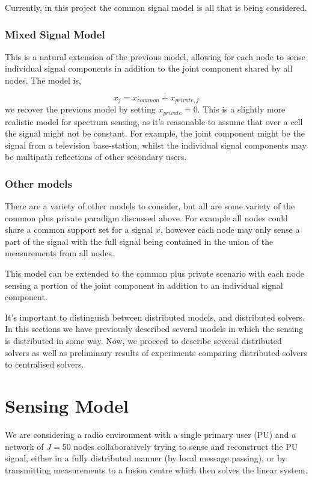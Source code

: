 Currently, in this project the common signal model is all that is being considered. 

\subsubsection{Mixed Signal Model}
This is a natural extension of the previous model, allowing for each node to sense individual signal components in addition to the joint component shared by all nodes. The model is,

\begin{equation}
x_j = x_{common} + x_{private,j}
\end{equation}
we recover the previous model by setting \(x_{private} = 0\). This is a slightly more realistic model for spectrum sensing, as it's reasonable to assume that over a cell the signal might not be constant. For example, the joint component might be the signal from a television base-station, whilst the individual signal components may be multipath reflections of other secondary users. 

\subsubsection{Other models}
There are a variety of other models to consider, but all  are some variety of the common plus private paradigm discussed above. For example all nodes could share a common support set for a signal \(x\), however each node may only sense a part of the signal with the full signal being contained in the union of the measurements from all nodes. 

This model can be extended to the common plus private scenario with each node sensing a portion of the joint component in addition to an individual signal component.

It's important to distinguish between distributed models, and distributed solvers. In this sections we have previously described several models in which the sensing is distributed in some way. Now, we proceed to describe several distributed solvers as well as preliminary results of experiments comparing distributed solvers to centralised solvers.

\section{Sensing Model}
\label{sensingmodel}
We are considering a radio environment with a single primary user (PU) and a network of \(J=\)50 nodes collaboratively trying to sense and reconstruct the PU signal, either in a fully distributed manner (by local message passing), or by transmitting measurements to a fusion centre which then solves the linear system. 


